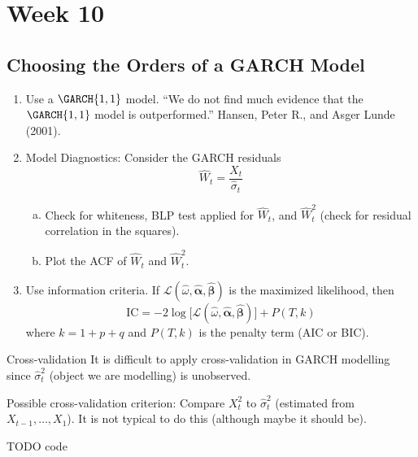 \chapter{Week 10}
\section{Choosing the Orders of a GARCH Model}
\begin{enumerate}[(1)]
    \item Use a $ \GARCH{1,1} $ model. ``We do not find much evidence
          that the $ \GARCH{1,1} $ model is outperformed.'' Hansen, Peter R., and Asger Lunde (2001).
    \item Model Diagnostics: Consider the GARCH residuals
          \[ \hat{W}_t=\frac{X_t}{\hat{\sigma}_t}  \]
          \begin{enumerate}[(a)]
              \item Check for whiteness, BLP test applied for $ \hat{W}_t $,
                    and $ \hat{W}_t^2 $ (check for residual correlation in the squares).
              \item Plot the ACF of $ \hat{W}_t $ and $ \hat{W}_t^2 $.
          \end{enumerate}
    \item Use information criteria. If $ \mathcal{L}(\hat{\omega},\hat{\symbf{\alpha}},\hat{\symbf{\beta}}) $
          is the maximized likelihood, then
          \[ \text{IC}=-2\log\bigl[\mathcal{L}(\hat{\omega},\hat{\symbf{\alpha}},\hat{\symbf{\beta}})\bigr]+P(T,k) \]
          where $ k=1+p+q $ and $ P(T,k) $ is the penalty term (AIC or BIC).
\end{enumerate}
\begin{Remark}{Cross-validation}{}
    It is difficult to apply cross-validation in GARCH modelling since
    $ \hat{\sigma}_t^2 $ (object we are modelling) is unobserved.

    \vspace{1mm}

    Possible cross-validation criterion: Compare $ X_t^2 $ to $ \hat{\sigma}_t^2 $
    (estimated from $ X_{t-1},\ldots,X_1 $). It is
    not typical to do this (although maybe it should be).
\end{Remark}
TODO code

